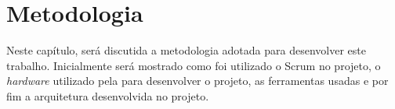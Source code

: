 \chapter[Metodologia]{Metodologia}
\label{chap:met}

Neste capítulo, será discutida a metodologia adotada para desenvolver este trabalho. Inicialmente será mostrado como foi utilizado o Scrum no projeto, o \textit{hardware} utilizado pela para desenvolver o projeto, as ferramentas usadas e por fim a arquitetura desenvolvida no projeto.





